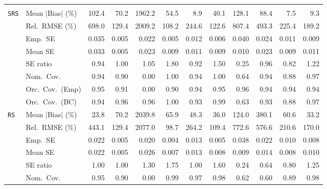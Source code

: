 \begin{landscape}
\begin{longtable}{llrrrrrrrrrr}
\addlinespace[2pt]
\multicolumn{12}{l}{\textbf{Interaction}} \\
\addlinespace[2pt]
\quad \texttt{SRS} & Mean $|$Bias$|$ (\%) & 102.4 & 70.2 & 1962.2 & 54.5 & \cellcolor{ranktwo}8.9 & 40.1 & 128.1 & 88.4 & \cellcolor{rankone}7.5 & \cellcolor{rankthree}9.3 \\
 & Rel.\ RMSE (\%) & 698.0 & \cellcolor{rankthree}129.4 & 2009.2 & \cellcolor{rankone}108.2 & 244.6 & \cellcolor{ranktwo}122.6 & 807.4 & 493.3 & 225.4 & 189.2 \\
 & Emp.\ SE & 0.035 & 0.005 & 0.022 & 0.005 & 0.012 & 0.006 & 0.040 & 0.024 & 0.011 & 0.009 \\
 & Mean SE & 0.033 & 0.005 & 0.023 & 0.009 & 0.011 & 0.009 & 0.010 & 0.023 & 0.009 & 0.011 \\
 & SE ratio & 0.94 & \cellcolor{rankone}1.00 & \cellcolor{rankthree}1.05 & 1.80 & 0.92 & 1.50 & 0.25 & \cellcolor{ranktwo}0.96 & 0.82 & 1.22 \\
 & Nom.\ Cov. & \cellcolor{rankone}0.94 & 0.90 & 0.00 & 1.00 & \cellcolor{ranktwo}0.94 & 1.00 & 0.64 & \cellcolor{rankthree}0.94 & 0.88 & 0.97 \\
 & Orc.\ Cov.\ (Emp) & \cellcolor{ranktwo}0.95 & 0.91 & 0.00 & 0.90 & \cellcolor{rankthree}0.94 & \cellcolor{rankone}0.95 & 0.96 & 0.94 & 0.94 & 0.94 \\
 & Orc.\ Cov.\ (BC) & \cellcolor{ranktwo}0.94 & \cellcolor{rankone}0.96 & \cellcolor{rankthree}0.96 & 1.00 & 0.93 & 0.99 & 0.63 & 0.93 & 0.88 & 0.97 \\
\addlinespace[2pt]
\quad \texttt{RS} & Mean $|$Bias$|$ (\%) & \cellcolor{rankone}23.8 & 70.2 & 2039.8 & 65.9 & 48.3 & \cellcolor{rankthree}36.0 & 124.0 & 380.1 & 60.6 & \cellcolor{ranktwo}33.2 \\
 & Rel.\ RMSE (\%) & 443.1 & \cellcolor{rankthree}129.4 & 2077.0 & \cellcolor{rankone}98.7 & 264.2 & \cellcolor{ranktwo}109.4 & 772.6 & 576.6 & 210.6 & 170.0 \\
 & Emp.\ SE & 0.022 & 0.005 & 0.020 & 0.004 & 0.013 & 0.005 & 0.038 & 0.022 & 0.010 & 0.008 \\
 & Mean SE & 0.022 & 0.005 & 0.026 & 0.007 & 0.013 & 0.008 & 0.009 & 0.014 & 0.008 & 0.010 \\
 & SE ratio & \cellcolor{rankone}1.00 & \cellcolor{ranktwo}1.00 & 1.30 & 1.75 & \cellcolor{rankthree}1.00 & 1.60 & 0.24 & 0.64 & 0.80 & 1.25 \\
 & Nom.\ Cov. & \cellcolor{rankone}0.95 & 0.90 & 0.00 & 0.99 & \cellcolor{ranktwo}0.97 & 0.98 & 0.62 & 0.60 & 0.89 & \cellcolor{rankthree}0.98 \\

\end{longtable}
\end{landscape}
